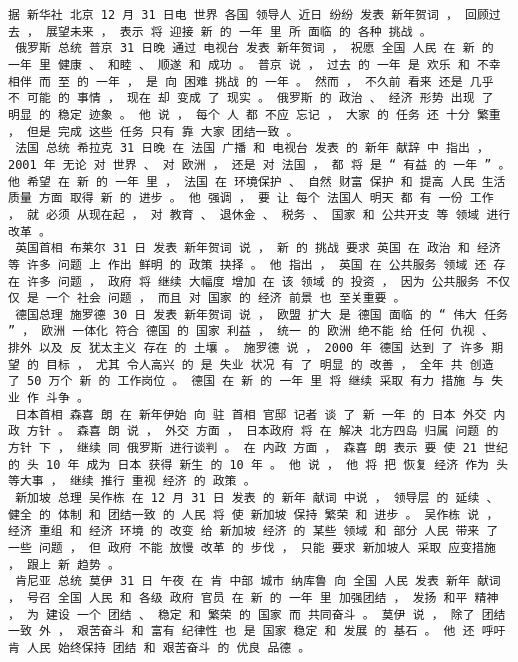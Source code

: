 \documentclass{article}
\begin{document}
\begin{Verbatim}[commandchars=\\\{\}]
 据 新华社 北京 12 月 31 日电 世界 各国 领导人 近日 纷纷 发表 新年贺词 ， 回顾过去 ， 展望未来 ， 表示 将 迎接 新 的 一年 里 所 面临 的 各种 挑战 。 
 俄罗斯 总统 普京 31 日晚 通过 电视台 发表 新年贺词 ， 祝愿 全国 人民 在 新 的 一年 里 健康 、 和睦 、 顺遂 和 成功 。 普京 说 ， 过去 的 一年 是 欢乐 和 不幸 相伴 而 至 的 一年 ， 是 向 困难 挑战 的 一年 。 然而 ， 不久前 看来 还是 几乎 不 可能 的 事情 ， 现在 却 变成 了 现实 。 俄罗斯 的 政治 、 经济 形势 出现 了 明显 的 稳定 迹象 。 他 说 ， 每个 人 都 不应 忘记 ， 大家 的 任务 还 十分 繁重 ， 但是 完成 这些 任务 只有 靠 大家 团结一致 。 
 法国 总统 希拉克 31 日晚 在 法国 广播 和 电视台 发表 的 新年 献辞 中 指出 ， 2001 年 无论 对 世界 、 对 欧洲 ， 还是 对 法国 ， 都 将 是 “ 有益 的 一年 ” 。 他 希望 在 新 的 一年 里 ， 法国 在 环境保护 、 自然 财富 保护 和 提高 人民 生活 质量 方面 取得 新 的 进步 。 他 强调 ， 要 让 每个 法国人 明天 都 有 一份 工作 ， 就 必须 从现在起 ， 对 教育 、 退休金 、 税务 、 国家 和 公共开支 等 领域 进行 改革 。 
 英国首相 布莱尔 31 日 发表 新年贺词 说 ， 新 的 挑战 要求 英国 在 政治 和 经济 等 许多 问题 上 作出 鲜明 的 政策 抉择 。 他 指出 ， 英国 在 公共服务 领域 还 存在 许多 问题 ， 政府 将 继续 大幅度 增加 在 该 领域 的 投资 ， 因为 公共服务 不仅仅 是 一个 社会 问题 ， 而且 对 国家 的 经济 前景 也 至关重要 。 
 德国总理 施罗德 30 日 发表 新年贺词 说 ， 欧盟 扩大 是 德国 面临 的 “ 伟大 任务 ” ， 欧洲 一体化 符合 德国 的 国家 利益 ， 统一 的 欧洲 绝不能 给 任何 仇视 、 排外 以及 反 犹太主义 存在 的 土壤 。 施罗德 说 ， 2000 年 德国 达到 了 许多 期望 的 目标 ， 尤其 令人高兴 的 是 失业 状况 有 了 明显 的 改善 ， 全年 共 创造 了 50 万个 新 的 工作岗位 。 德国 在 新 的 一年 里 将 继续 采取 有力 措施 与 失业 作 斗争 。 
 日本首相 森喜 朗 在 新年伊始 向 驻 首相 官邸 记者 谈 了 新 一年 的 日本 外交 内政 方针 。 森喜 朗 说 ， 外交 方面 ， 日本政府 将 在 解决 北方四岛 归属 问题 的 方针 下 ， 继续 同 俄罗斯 进行谈判 。 在 内政 方面 ， 森喜 朗 表示 要 使 21 世纪 的 头 10 年 成为 日本 获得 新生 的 10 年 。 他 说 ， 他 将 把 恢复 经济 作为 头等大事 ， 继续 推行 重视 经济 的 政策 。 
 新加坡 总理 吴作栋 在 12 月 31 日 发表 的 新年 献词 中说 ， 领导层 的 延续 、 健全 的 体制 和 团结一致 的 人民 将 使 新加坡 保持 繁荣 和 进步 。 吴作栋 说 ， 经济 重组 和 经济 环境 的 改变 给 新加坡 经济 的 某些 领域 和 部分 人民 带来 了 一些 问题 ， 但 政府 不能 放慢 改革 的 步伐 ， 只能 要求 新加坡人 采取 应变措施 ， 跟上 新 趋势 。 
 肯尼亚 总统 莫伊 31 日 午夜 在 肯 中部 城市 纳库鲁 向 全国 人民 发表 新年 献词 ， 号召 全国 人民 和 各级 政府 官员 在 新 的 一年 里 加强团结 ， 发扬 和平 精神 ， 为 建设 一个 团结 、 稳定 和 繁荣 的 国家 而 共同奋斗 。 莫伊 说 ， 除了 团结一致 外 ， 艰苦奋斗 和 富有 纪律性 也 是 国家 稳定 和 发展 的 基石 。 他 还 呼吁 肯 人民 始终保持 团结 和 艰苦奋斗 的 优良 品德 。 

\end{Verbatim}
\end{document}
